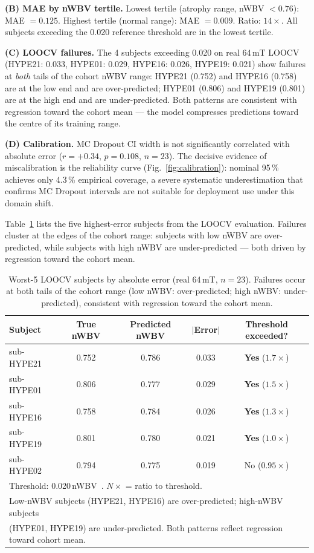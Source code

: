 \documentclass[12pt,a4paper]{article}
\begin{document}
\textbf{(B) MAE by nWBV tertile.} Lowest tertile (atrophy range,
nWBV $< 0.76$): MAE $= 0.125$. Highest tertile (normal range): MAE $= 0.009$.
Ratio: $14\times$. All subjects exceeding the 0.020 reference threshold are
in the lowest tertile.

\textbf{(C) LOOCV failures.} The 4 subjects exceeding 0.020 on real 64\,mT
LOOCV (HYPE21: 0.033, HYPE01: 0.029, HYPE16: 0.026, HYPE19: 0.021) show
failures at \emph{both} tails of the cohort nWBV range: HYPE21 (0.752)
and HYPE16 (0.758) are at the low end and are over-predicted; HYPE01
(0.806) and HYPE19 (0.801) are at the high end and are under-predicted.
Both patterns are consistent with regression toward the cohort mean ---
the model compresses predictions toward the centre of its training range.

\textbf{(D) Calibration.} MC Dropout CI width is not significantly correlated
with absolute error ($r = +0.34$, $p = 0.108$, $n = 23$). The decisive
evidence of miscalibration is the reliability curve
(Fig.~\ref{fig:calibration}): nominal 95\,\% achieves only 4.3\,\% empirical
coverage, a severe systematic underestimation that confirms MC Dropout
intervals are not suitable for deployment use under this domain shift.

Table~\ref{tab:worst5} lists the five highest-error subjects from the
LOOCV evaluation. Failures cluster at the edges of the cohort range:
subjects with low nWBV are over-predicted, while subjects with high nWBV
are under-predicted --- both driven by regression toward the cohort mean.

\begin{table}[!t]
\caption{Worst-5 LOOCV subjects by absolute error (real 64\,mT, $n=23$).
Failures occur at both tails of the cohort range (low nWBV: over-predicted;
high nWBV: under-predicted), consistent with regression toward the cohort mean.}
\label{tab:worst5}
\centering
\setlength{\tabcolsep}{8pt}
\renewcommand{\arraystretch}{1.1}
\begin{tabular}{lcccc}
\toprule
Subject & True nWBV & Predicted nWBV & $|$Error$|$ & Threshold exceeded? \\
\midrule
sub-HYPE21 & 0.752 & 0.786 & 0.033 & \textbf{Yes} ($1.7\times$) \\
sub-HYPE01 & 0.806 & 0.777 & 0.029 & \textbf{Yes} ($1.5\times$) \\
sub-HYPE16 & 0.758 & 0.784 & 0.026 & \textbf{Yes} ($1.3\times$) \\
sub-HYPE19 & 0.801 & 0.780 & 0.021 & \textbf{Yes} ($1.0\times$) \\
sub-HYPE02 & 0.794 & 0.775 & 0.019 & No ($0.95\times$) \\
\bottomrule
\multicolumn{5}{l}{\footnotesize Threshold: 0.020\,nWBV~\cite{buckner2004}. $N\times$ = ratio to threshold.}\\
\multicolumn{5}{l}{\footnotesize Low-nWBV subjects (HYPE21, HYPE16) are over-predicted; high-nWBV subjects}\\
\multicolumn{5}{l}{\footnotesize (HYPE01, HYPE19) are under-predicted. Both patterns reflect regression toward cohort mean.}
\end{tabular}
\end{table}
\end{document}
